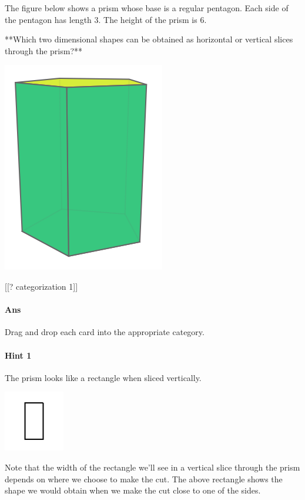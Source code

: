 \documentclass[twocolumn,10pt]{article}
\def\shrinkfactor{0.4}
\begin{document}
\noindent
The figure below shows a prism whose base is a regular pentagon. Each side of the pentagon has length $3$. The height of the prism is $6$. 

**Which two dimensional shapes can be obtained as  horizontal or vertical slices through the prism?**  


\includegraphics[scale=\shrinkfactor]{figures/5ada81db609c40821a80a0afea3b253e67a1b203.png}

[[? categorization 1]]

\paragraph{Ans} Drag and drop each card into the appropriate category. 

\paragraph{Hint 1}The prism looks like a rectangle when sliced vertically.  

\includegraphics[scale=\shrinkfactor]{figures/225bc3d058cebe2059fc56f78ef80b5f3e0f2da7.png}

Note that the width of the rectangle we'll see in a vertical slice through the prism depends on where we choose to make the cut. The above rectangle shows the shape we would obtain when we make the cut close to one of the sides. 
\end{document}
